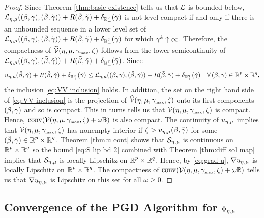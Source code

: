 \begin{proof}
Since Theorem \ref{thm:basic existence} tells us that
$\LL$ is bounded below, 
$\LL_{\emu}(\bg,\tbg) + R\tbg+\del_{\R^q_+}(\tgam)$ is not level compact
if and only if there is an unbounded sequence
in a lower level set of 
$\LL_{\emu}(\bg,\tbg) + R\tbg+\del_{\R^q_+}(\tgam)$ 
for which $\gam^k\uparrow\infty$.
Therefore, the compactness of $\widehat\VV(\eta,\mu,\gammax,\zeta)$ 
follows from the lower semicontinuity of  
$\LL_{\emu}(\bg,\tbg) + R\tbg+\del_{\R^q_+}(\tgam)$.
Since
\[
\uemu\tbg + R\tbg+\del_{\Rqp}(\tgam)\le 
\LL_{\emu}(\bg,\tbg) + R\tbg+\del_{\R^q_+}(\tgam)\quad
\forall\, \bg\in\Rp\times\Rq,
\]
the inclusion \eqref{eq:VV inclusion} holds.
In addition, the set on the right hand side of \eqref{eq:VV inclusion}
is the projection of $\widehat\VV(\eta,\mu,\gammax,\zeta)$ onto
its
first components $\bg$ and so is compact. This in turns tells us that 
$\VV(\eta,\mu,\gammax,\zeta)$ is compact. Hence, 
$\clco(\VV(\eta,\mu,\gammax,\zeta)+\omega\uball)$
is also compact. The continuity of $\uemu$ implies that 
$\VV(\eta,\mu,\gammax,\zeta)$ has nonempty interior if
$\zeta>\uemu\tbg$ for some $\tbg\in\Rp\times\Rq$.
Theorem \ref{thm:u cont} shows that $\SS_\emu$ is continuous on 
$\Rp\times\Rq$ so the bound \eqref{eq:S lip bd 2} combined with 
Theorem \ref{thm:diff sol map} implies that $\SS_\emu$ is locally
Lipschitz on $\Rp\times\Rq$. Hence, by \eqref{eq:grad u},
$\nabla \uemu$ is locally Lipschitz on $\Rp\times\Rq$.
The compactness of 
$\clco(\VV(\eta,\mu,\gammax,\zeta)+\omega\uball)$
tells us that $\nabla \uemu$ is Lipschitz on
this set for all $\omega\ge 0$.
\end{proof}


\subsection{Convergence of the PGD Algorithm for \texorpdfstring{$\Phi_\emu$}{}}
\label{sec:convergence pgd}

